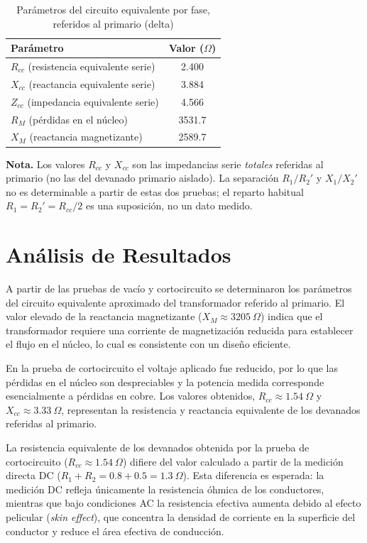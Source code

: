\documentclass[conference]{IEEEtran}
\begin{document}
\begin{table}[H]
\centering
\begin{tabular}{|l|c|}
\hline
\textbf{Parámetro} & \textbf{Valor ($\Omega$)} \\ \hline
$R_{cc}$ (resistencia equivalente serie) & 2.400 \\ \hline
$X_{cc}$ (reactancia equivalente serie) & 3.884 \\ \hline
$Z_{cc}$ (impedancia equivalente serie) & 4.566 \\ \hline
$R_M$ (pérdidas en el núcleo) & 3531.7 \\ \hline
$X_M$ (reactancia magnetizante) & 2589.7 \\ \hline
\end{tabular}
\caption{Parámetros del circuito equivalente por fase, referidos al primario (delta)}
\label{tab:resumen}
\end{table}

\noindent\textbf{Nota.} Los valores $R_{cc}$ y $X_{cc}$ son las impedancias serie
\textit{totales} referidas al primario (no las del devanado primario aislado).
La separación $R_1/R_2'$ y $X_1/X_2'$ no es determinable a partir de estas dos
pruebas; el reparto habitual $R_1 = R_2' = R_{cc}/2$ es una suposición, no un
dato medido.

\section{Análisis de Resultados}

A partir de las pruebas de vacío y cortocircuito se determinaron los parámetros del circuito equivalente aproximado del transformador referido al primario. El valor elevado de la reactancia magnetizante ($X_M \approx 3205\ \Omega$) indica que el transformador requiere una corriente de magnetización reducida para establecer el flujo en el núcleo, lo cual es consistente con un diseño eficiente.

En la prueba de cortocircuito el voltaje aplicado fue reducido, por lo que las pérdidas en el núcleo son despreciables y la potencia medida corresponde esencialmente a pérdidas en cobre. Los valores obtenidos, $R_{cc} \approx 1.54\ \Omega$ y $X_{cc} \approx 3.33\ \Omega$, representan la resistencia y reactancia equivalente de los devanados referidas al primario.

La resistencia equivalente de los devanados obtenida por la prueba de cortocircuito ($R_{cc} \approx 1.54\ \Omega$) difiere del valor calculado a partir de la medición directa DC ($R_1 + R_2 = 0.8 + 0.5 = 1.3\ \Omega$). Esta diferencia es esperada: la medición DC refleja únicamente la resistencia óhmica de los conductores, mientras que bajo condiciones AC la resistencia efectiva aumenta debido al efecto pelicular (\textit{skin effect}), que concentra la densidad de corriente en la superficie del conductor y reduce el área efectiva de conducción.
\end{document}
